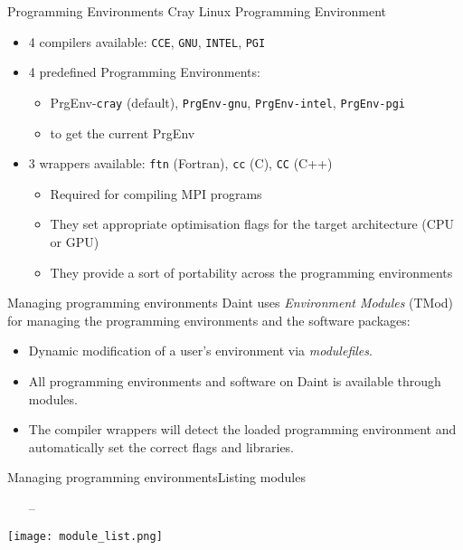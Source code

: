 \begin{frame}[fragile]{Programming Environments}
  Cray Linux Programming Environment
  \begin{itemize}
  \item 4 compilers available: \texttt{CCE}, \texttt{GNU}, \texttt{INTEL}, \texttt{PGI}
  \item 4 predefined Programming Environments:
    \begin{itemize}
    \item PrgEnv-\texttt{cray} (default), \texttt{PrgEnv-gnu}, \texttt{PrgEnv-intel}, \texttt{PrgEnv-pgi}
    \item {} to get the current PrgEnv
    \end{itemize}
  \item 3 wrappers available: \texttt{ftn} (Fortran), \texttt{cc} (C), \texttt{CC} (C++)
    \begin{itemize}
    \item Required for compiling MPI programs
    \item They set appropriate optimisation flags for the target architecture (CPU or GPU)
    \item They provide a sort of portability across the programming environments
    \end{itemize}
  \end{itemize}
\end{frame}


\begin{frame}{Managing programming environments}
  Daint uses \emph{Environment Modules} (TMod) for managing the programming
  environments and the software packages:
  \vspace\baselineskip
  \begin{itemize}
  \item Dynamic modification of a user's environment via \emph{modulefiles}.
  \item All programming environments and software on Daint is available through modules.
  \item The compiler wrappers will detect the loaded programming environment
    and automatically set the correct flags and libraries.
  \end{itemize}
\end{frame}


\begin{frame}{Managing programming environments}{Listing modules}
  \begin{itemize}
  \item[--] 
  \end{itemize}
  {
    \centering
    \texttt{[image: module\_list.png]}
  }
\end{frame}

